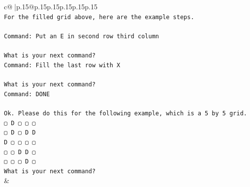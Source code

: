 \documentclass{article}
\begin{document}
{\begin{supertabular}{c@{$\;$}|p{.15\linewidth}@{}p{.15\linewidth}p{.15\linewidth}p{.15\linewidth}p{.15\linewidth}p{.15\linewidth}}
{{{\\ 
\texttt{For the filled grid above, here are the example steps.} \\
\\ 
\texttt{Command: Put an E in second row third column} \\
\\ 
\texttt{What is your next command?} \\
\texttt{Command: Fill the last row with X} \\
\\ 
\texttt{What is your next command?} \\
\texttt{Command: DONE} \\
\\ 
\texttt{Ok. Please do this for the following example, which is a 5 by 5 grid.} \\
\texttt{▢ D ▢ ▢ ▢} \\
\texttt{▢ D ▢ D D} \\
\texttt{D ▢ ▢ ▢ ▢} \\
\texttt{▢ ▢ D D ▢} \\
\texttt{▢ ▢ ▢ D ▢} \\
\texttt{What is your next command?} \\
            }
        }
    }
    & \\ \\


\end{supertabular}}
\end{document}
